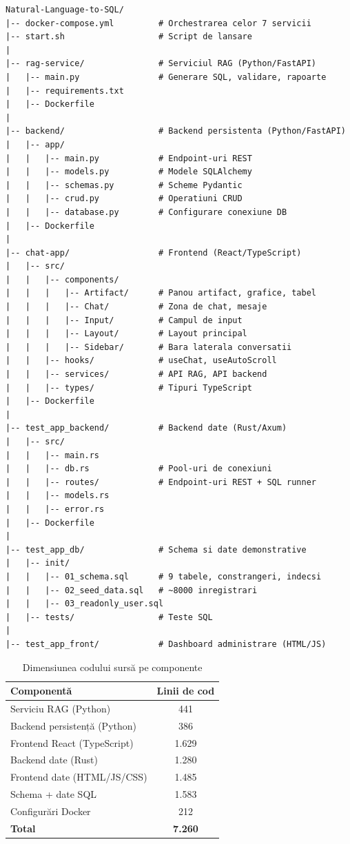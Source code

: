 \documentclass[12pt, a4paper]{report}
\begin{document}
\begin{lstlisting}[caption={Structura proiectului}, language={}]
Natural-Language-to-SQL/
|-- docker-compose.yml         # Orchestrarea celor 7 servicii
|-- start.sh                   # Script de lansare
|
|-- rag-service/               # Serviciul RAG (Python/FastAPI)
|   |-- main.py                # Generare SQL, validare, rapoarte
|   |-- requirements.txt
|   |-- Dockerfile
|
|-- backend/                   # Backend persistenta (Python/FastAPI)
|   |-- app/
|   |   |-- main.py            # Endpoint-uri REST
|   |   |-- models.py          # Modele SQLAlchemy
|   |   |-- schemas.py         # Scheme Pydantic
|   |   |-- crud.py            # Operatiuni CRUD
|   |   |-- database.py        # Configurare conexiune DB
|   |-- Dockerfile
|
|-- chat-app/                  # Frontend (React/TypeScript)
|   |-- src/
|   |   |-- components/
|   |   |   |-- Artifact/      # Panou artifact, grafice, tabel
|   |   |   |-- Chat/          # Zona de chat, mesaje
|   |   |   |-- Input/         # Campul de input
|   |   |   |-- Layout/        # Layout principal
|   |   |   |-- Sidebar/       # Bara laterala conversatii
|   |   |-- hooks/             # useChat, useAutoScroll
|   |   |-- services/          # API RAG, API backend
|   |   |-- types/             # Tipuri TypeScript
|   |-- Dockerfile
|
|-- test_app_backend/          # Backend date (Rust/Axum)
|   |-- src/
|   |   |-- main.rs
|   |   |-- db.rs              # Pool-uri de conexiuni
|   |   |-- routes/            # Endpoint-uri REST + SQL runner
|   |   |-- models.rs
|   |   |-- error.rs
|   |-- Dockerfile
|
|-- test_app_db/               # Schema si date demonstrative
|   |-- init/
|   |   |-- 01_schema.sql      # 9 tabele, constrangeri, indecsi
|   |   |-- 02_seed_data.sql   # ~8000 inregistrari
|   |   |-- 03_readonly_user.sql
|   |-- tests/                 # Teste SQL
|
|-- test_app_front/            # Dashboard administrare (HTML/JS)
\end{lstlisting}

\begin{table}[H]
\centering
\caption{Dimensiunea codului sursă pe componente}
\label{tab:loc}
\begin{tabular}{l c}
\toprule
\textbf{Componentă} & \textbf{Linii de cod} \\
\midrule
Serviciu RAG (Python) & 441 \\
Backend persistență (Python) & 386 \\
Frontend React (TypeScript) & 1.629 \\
Backend date (Rust) & 1.280 \\
Frontend date (HTML/JS/CSS) & 1.485 \\
Schema + date SQL & 1.583 \\
Configurări Docker & 212 \\
\midrule
\textbf{Total} & \textbf{7.260} \\
\bottomrule
\end{tabular}
\end{table}
\end{document}
